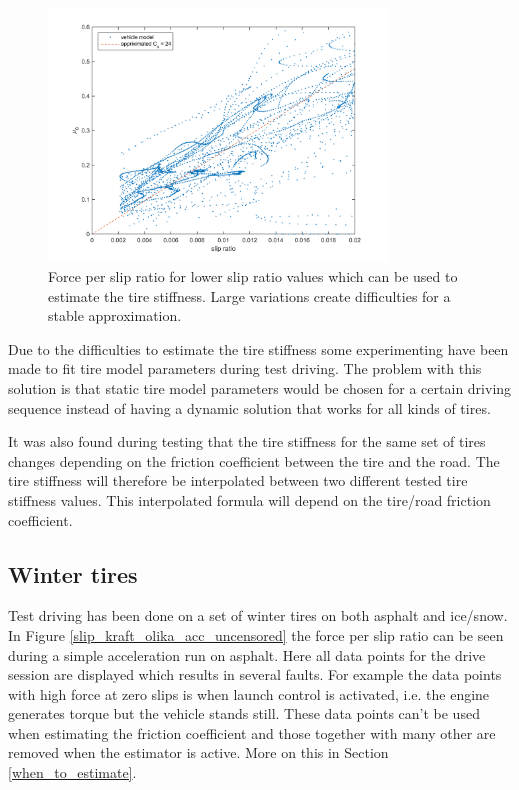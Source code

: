 \begin{figure}[h]
	\centering
	\includegraphics[width=0.8\textwidth]{Pictures/slip_kraft_sma_slip}
	\caption {Force per slip ratio for lower slip ratio values which can be used to estimate the tire stiffness. Large variations create difficulties for a stable approximation.}
	\label{slip_kraft_sma_slip}
\end{figure}

Due to the difficulties to estimate the tire stiffness some experimenting have been made to fit tire model parameters during test driving. The problem with this solution is that static tire model parameters would be chosen for a certain driving sequence instead of having a dynamic solution that works for all kinds of tires. 

It was also found during testing that the tire stiffness for the same set of tires changes depending on the friction coefficient between the tire and the road. The tire stiffness will therefore be interpolated between two different tested tire stiffness values. This interpolated formula will depend on the tire/road friction coefficient. 

\subsection{Winter tires}
\label{winter_tire}
Test driving has been done on a set of winter tires on both asphalt and ice/snow. In Figure \ref{slip_kraft_olika_acc_uncensored} the force per slip ratio can be seen during a simple acceleration run on asphalt. Here all data points for the drive session are displayed which results in several faults. For example the data points with high force at zero slips is when launch control is activated, i.e. the engine generates torque but the vehicle stands still. These data points can't be used when estimating the friction coefficient and those together with many other are removed when the estimator is active. More on this in Section \ref{when_to_estimate}.   

